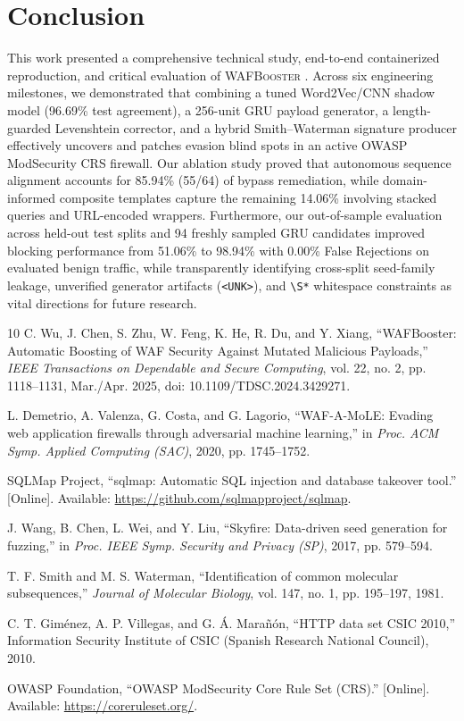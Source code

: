 \documentclass[conference]{IEEEtran}
\newcommand{\WAFB}{\textsc{WAFBooster}}
\begin{document}
\section{Conclusion}
This work presented a comprehensive technical study, end-to-end containerized reproduction, and critical evaluation of \WAFB{} \cite{wu2025}. Across six engineering milestones, we demonstrated that combining a tuned Word2Vec/CNN shadow model (96.69\% test agreement), a 256-unit GRU payload generator, a length-guarded Levenshtein corrector, and a hybrid Smith--Waterman signature producer effectively uncovers and patches evasion blind spots in an active OWASP ModSecurity CRS firewall. Our ablation study proved that autonomous sequence alignment accounts for 85.94\% (55/64) of bypass remediation, while domain-informed composite templates capture the remaining 14.06\% involving stacked queries and URL-encoded wrappers. Furthermore, our out-of-sample evaluation across held-out test splits and 94 freshly sampled GRU candidates improved blocking performance from 51.06\% to 98.94\% with 0.00\% False Rejections on evaluated benign traffic, while transparently identifying cross-split seed-family leakage, unverified generator artifacts (\texttt{<UNK>}), and \texttt{\textbackslash S*} whitespace constraints as vital directions for future research.

\begin{thebibliography}{10}
C. Wu, J. Chen, S. Zhu, W. Feng, K. He, R. Du, and Y. Xiang, ``WAFBooster: Automatic Boosting of WAF Security Against Mutated Malicious Payloads,'' \emph{IEEE Transactions on Dependable and Secure Computing}, vol. 22, no. 2, pp. 1118--1131, Mar./Apr. 2025, doi: 10.1109/TDSC.2024.3429271.

L. Demetrio, A. Valenza, G. Costa, and G. Lagorio, ``WAF-A-MoLE: Evading web application firewalls through adversarial machine learning,'' in \emph{Proc. ACM Symp. Applied Computing (SAC)}, 2020, pp. 1745--1752.

SQLMap Project, ``sqlmap: Automatic SQL injection and database takeover tool.'' [Online]. Available: \url{https://github.com/sqlmapproject/sqlmap}.

J. Wang, B. Chen, L. Wei, and Y. Liu, ``Skyfire: Data-driven seed generation for fuzzing,'' in \emph{Proc. IEEE Symp. Security and Privacy (SP)}, 2017, pp. 579--594.

T. F. Smith and M. S. Waterman, ``Identification of common molecular subsequences,'' \emph{Journal of Molecular Biology}, vol. 147, no. 1, pp. 195--197, 1981.

C. T. Giménez, A. P. Villegas, and G. Á. Marañón, ``HTTP data set CSIC 2010,'' Information Security Institute of CSIC (Spanish Research National Council), 2010.

OWASP Foundation, ``OWASP ModSecurity Core Rule Set (CRS).'' [Online]. Available: \url{https://coreruleset.org/}.
\end{thebibliography}
\end{document}
